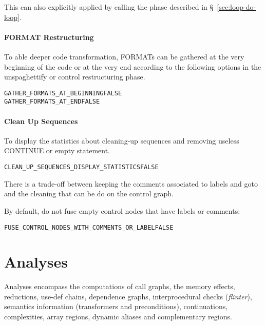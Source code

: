 \documentclass[a4paper]{report}
\newenvironment{PipsProp}{\begin{alltt}}{\end{alltt}}
\begin{document}
This can also explicitly applied by calling the phase described in
\S~\ref{sec:loop-do-loop}.


\subsubsection*{FORMAT Restructuring}

To able deeper code transformation, FORMATs can be gathered at the
very beginning of the code or at the very end according to the
following options in the unspaghettify or control restructuring phase.
\begin{PipsProp}
GATHER_FORMATS_AT_BEGINNING FALSE
GATHER_FORMATS_AT_END FALSE
\end{PipsProp}


\subsubsection*{Clean Up Sequences}

To display the statistics about cleaning-up sequences and removing
useless CONTINUE or empty statement.
\begin{PipsProp}
CLEAN_UP_SEQUENCES_DISPLAY_STATISTICS FALSE
\end{PipsProp}

There is a trade-off between keeping the comments associated to labels and
goto and the cleaning that can be do on the control graph.

By default, do not fuse empty control nodes that have labels or comments:
\begin{PipsProp}
FUSE_CONTROL_NODES_WITH_COMMENTS_OR_LABEL FALSE
\end{PipsProp}



\chapter{Analyses}
\label{section-analyses}

Analyses encompass the computations of call graphs, the memory effects,
reductions, use-def chains, dependence graphs, interprocedural checks
({\em flinter}), semantics information (transformers and preconditions),
continuations, complexities, array regions, dynamic aliases and
complementary regions.
\end{document}
